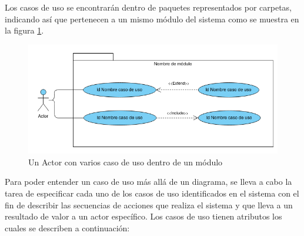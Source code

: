 Los casos de uso se encontrarán dentro de paquetes representados por carpetas, indicando así que pertenecen a un mismo módulo del sistema como se muestra en la figura \ref{fig:pack}.

\begin{figure}[hbtp!]
	\begin{center}
		\includegraphics[width=.4\textwidth]{LIT/Paquete.png}
	\end{center}
	\caption{Un Actor con varios caso de uso dentro de un módulo}
	\label{fig:pack}
\end{figure}

Para poder entender un caso de uso más allá de un diagrama, se lleva a cabo la tarea de especificar cada uno de los casos de uso identificados en el sistema con el fin de describir las secuencias de acciones que realiza el sistema y que lleva a un resultado de valor a un actor específico. Los casos de uso tienen atributos los cuales se describen a continuación:

